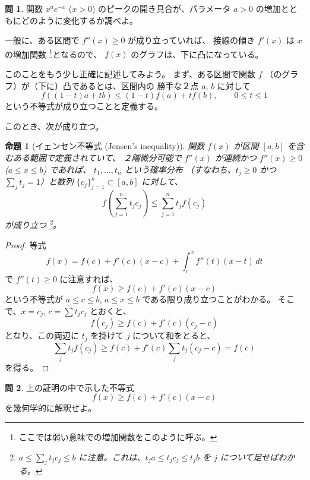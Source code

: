 \documentclass[a4paper]{jsarticle}
\newtheorem{Proposition}[Theorem]{命題}
\theoremstyle{definition}
\newtheorem{Exercise}{問}%
\theoremstyle{remark}
\begin{document}
\begin{Exercise}
関数 $x^a e^{-x}$ ($x>0$) 
のピークの開き具合が、パラメータ $a>0$ の増加とともにどのように変化するか調べよ。
\end{Exercise}

一般に、ある区間で $f''(x) \geq 0$ が成り立っていれば、
接線の傾き $f'(x)$ は $x$ の増加関数
\footnote{ここでは弱い意味での増加関数をこのように呼ぶ。}となるので、
$f(x)$ のグラフは、下に凸になっている。

このことをもう少し正確に記述してみよう。
まず、ある区間で関数 $f$ （のグラフ）が（下に）凸であるとは、区間内の
勝手な２点 $a$, $b$ に対して
\[
f((1-t)a + tb) \leq (1-t)f(a) + tf(b),
\qquad
0 \leq t \leq 1
\]
という不等式が成り立つことと定義する。

\begin{figure}[htbp]
\centering

\caption{}
\end{figure}

このとき、次が成り立つ。

\begin{Proposition}[イェンセン不等式 (Jensen's inequality)]
関数 $f(x)$ が区間 $[a,b]$ を含むある範囲で定義されていて、
２階微分可能で $f''(x)$ が連続かつ
$f''(x) \geq 0$ ($a \leq x \leq b$) であれば、
$t_1,\dots, t_n$ という確率分布
（すなわち、$t_j \geq 0$ かつ $\sum_j t_j = 1$）と数列
$\{ c_j \}_{j=1}^n \subset [a,b]$ に対して、
\[
f\left(
\sum_{j=1}^n t_j c_j
\right) \leq \sum_{j=1}^n t_j f(c_j)
\]
が成り立つ
\footnote{
$a \leq \sum_j t_jc_j \leq b$ に注意。これは、$t_ja \leq t_jc_j \leq t_j b$ を $j$ について足せばわかる。
}。
\end{Proposition}

\begin{proof}
等式
\[
f(x) = f(c) + f'(c)(x-c) + \int_c^x f''(t)(x-t)\,dt
\]
で $f''(t) \geq 0$ に注意すれば、
\[
f(x) \geq f(c) + f'(c)(x-c)
\]
という不等式が $a \leq c \leq b$, $a \leq x \leq b$ である限り成り立つことがわかる。
そこで、$x = c_j$, $c = \sum t_j c_j$ とおくと、
\[
f(c_j) \geq f(c) + f'(c) (c_j -c)
\]
となり、この両辺に $t_j$ を掛けて $j$ について和をとると、
\[
\sum_j t_j f(c_j) \geq f(c) + f'(c) \sum_j t_j(c_j - c)
= f(c)
\]
を得る。
\end{proof}

\begin{Exercise}
上の証明の中で示した不等式
\[
f(x) \geq f(c) + f'(c)(x-c)
\]
を幾何学的に解釈せよ。
\end{Exercise}
\end{document}
